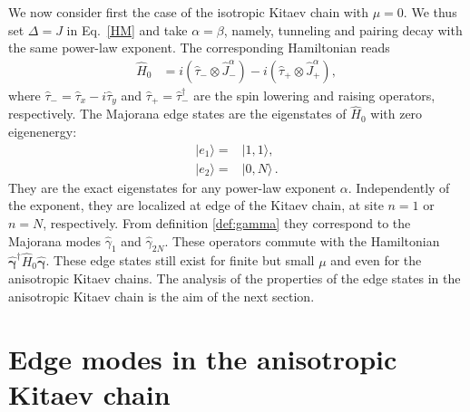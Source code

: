 \documentclass[pra,twocolumn,
superscriptaddress,
showpacs,
aps
]{revtex4-1}
\begin{document}
We now consider first the case of the isotropic Kitaev chain with  $\mu=0$. We thus set $\Delta=J$ in Eq.~\eqref{HM} and take $\alpha=\beta$, namely, tunneling and pairing decay with the same power-law exponent. The  corresponding Hamiltonian reads
\begin{align}
\hat{H}_0&=i\left(\hat{\tau}_-\otimes \hat{J}^{\alpha}_{-}\right)-i\left(\hat{\tau}_+\otimes \hat{J}^{\alpha}_{+}\right),\label{H0}
\end{align}
where $\hat{\tau}_{-}=\hat{\tau}_x-i\hat{\tau}_y$ and $\hat{\tau}_{+}=\hat{\tau}_-^{\dag}$ are the spin lowering and raising operators, respectively. The Majorana edge states are the eigenstates of $\hat{H}_0$ with zero eigenenergy: 
\begin{align}
|e_1\rangle=&|1,1\rangle,\\
|e_2\rangle=&|0,N\rangle\,.
\end{align}
They are the exact eigenstates for any power-law exponent $\alpha$. Independently of the exponent, they are localized at edge of the Kitaev chain, at site $n=1$ or $n=N$, respectively. From definition \eqref{def:gamma} they correspond to the Majorana modes $\hat{\gamma}_1$ and $\hat{\gamma}_{2N}$. These operators  commute with the Hamiltonian $\hat{\boldsymbol{\gamma}}^{\dag}\hat{H}_{0}\hat{\boldsymbol{\gamma}}$. These edge states still exist for finite but small $\mu$ and even for the anisotropic Kitaev chains. The analysis of the properties of the edge states in the anisotropic Kitaev chain is the aim of the next section.

\section{Edge modes in the anisotropic Kitaev chain}
\label{sec:2}
\end{document}
